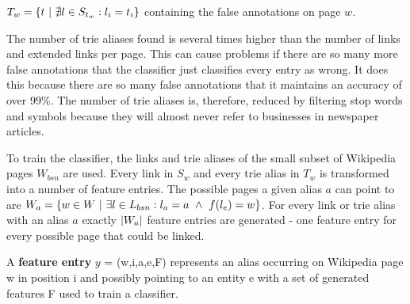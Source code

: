 $T_w = \{ t {\mbox{ }|\mbox{ }} \nexists l \in S_{t_w}: l_i = t_i \}$ containing the false annotations on page $w$.\par
The number of trie aliases found is several times higher than the number of links and extended links per page. This can cause problems if there are so many more false annotations that the classifier just classifies every entry as wrong. It does this because there are so many false annotations that it maintains an accuracy of over 99\%. The number of trie aliases is, therefore, reduced by filtering stop words and symbols because they will almost never refer to businesses in newspaper articles.\par
To train the classifier, the links and trie aliases of the small subset of Wikipedia pages $W_{bsn}$ are used. Every link in $S_w$ and every trie alias in $T_w$ is transformed into a number of feature entries. The possible pages a given alias $a$ can point to are $W_a = \{ w \in W {\mbox{ }|\mbox{ }} \exists l \in L_{bsn}: l_a = a {\mbox{ }\wedge\mbox{ }} f(l_e) = w \}$. For every link or trie alias with an alias $a$ exactly $\left|W_a\right|$ feature entries are generated - one feature entry for every possible page that could be linked.
\begin{definition}
A \textbf{feature entry} $y$ = (w,i,a,e,F) represents an alias occurring on Wikipedia page w in position i and possibly pointing to an entity e with a set of generated features F used to train a classifier.
\label{featureentry}
\end{definition}
